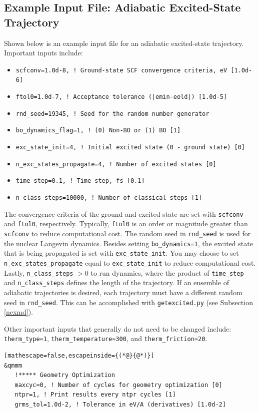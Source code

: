 \documentclass[letterpaper,12pt,titlepage]{article}
\begin{document}
\begin{appendix}
\subsection{Example Input File: Adiabatic Excited-State Trajectory}
\label{input_amd}
Shown below is an example input file for an adiabatic excited-state trajectory.  Important inputs include:
\begin{itemize}
\item \verb+scfconv=1.0d-8, ! Ground-state SCF convergence criteria, eV [1.0d-6]+
\item \verb+ftol0=1.0d-7, ! Acceptance tolerance (|emin-eold|) [1.0d-5]+
\item \verb+rnd_seed=19345, ! Seed for the random number generator+
\item \verb+bo_dynamics_flag=1, ! (0) Non-BO or (1) BO [1]+
\item \verb+exc_state_init=4, ! Initial excited state (0 - ground state) [0]+
\item \verb+n_exc_states_propagate=4, ! Number of excited states [0]+
\item \verb+time_step=0.1, ! Time step, fs [0.1]+
\item \verb+n_class_steps=10000, ! Number of classical steps [1]+
\end{itemize}
The convergence criteria of the ground and excited state are set with \verb+scfconv+ and \verb+ftol0+, respectively.  Typically, \verb+ftol0+ is an order or magnitude greater than \verb+scfconv+ to reduce computational cost.  The random seed in \verb+rnd_seed+ is used for the nuclear Langevin dynamics.  Besides setting \verb+bo_dynamics=1+, the excited state that is being propagated is set with \verb+exc_state_init+.  You may choose to set \verb+n_exc_states_propagate+ equal to \verb+exc_state_init+ to reduce computational cost.  Lastly, \verb+n_class_steps+ $>0$ to run dynamics, where the product of \verb+time_step+ and \verb+n_class_steps+ defines the length of the trajectory.  If an ensemble of adiabatic trajectories is desired, each trajectory must have a different random seed in \verb+rnd_seed+.  This can be accomplished with \verb+getexcited.py+ (see Subsection \ref{nexmd}).

Other important inputs that generally do not need to be changed include: \verb+therm_type=1+, \verb+therm_temperature=300+, and \verb+therm_friction=20+.
\begin{lstlisting}[mathescape=false,escapeinside={(*@}{@*)}]
&qmmm
   !***** Geometry Optimization
   maxcyc=0, ! Number of cycles for geometry optimization [0]
   ntpr=1, ! Print results every ntpr cycles [1]
   grms_tol=1.0d-2, ! Tolerance in eV/A (derivatives) [1.0d-2]


\end{lstlisting}
\end{appendix}
\end{document}
